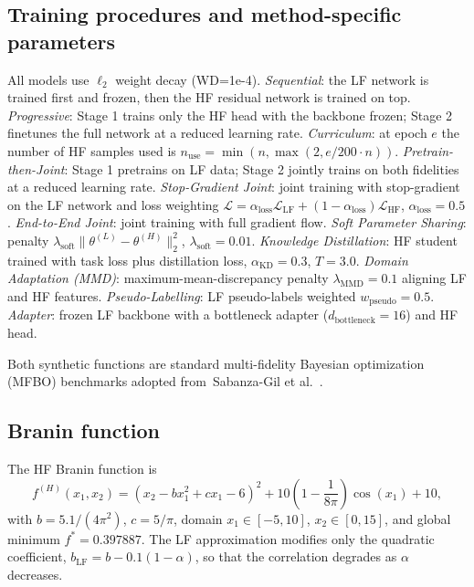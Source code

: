 \documentclass[11pt,a4paper]{article}%
\begin{document}
\subsection{Training procedures and method-specific parameters}
\label{suppsec:training_procedures}
All models use $\ell_2$ weight decay (WD=1e-4). \emph{Sequential}: the LF network is
trained first and frozen, then the HF residual network is trained on top.
\emph{Progressive}: Stage 1 trains only the HF head with the backbone frozen; Stage 2
finetunes the full network at a reduced learning rate. \emph{Curriculum}: at epoch $e$ the
number of HF samples used is $n_{\text{use}} = \min(n, \max(2, e/200 \cdot n))$.
\emph{Pretrain-then-Joint}: Stage 1 pretrains on LF data; Stage 2 jointly trains on both
fidelities at a reduced learning rate. \emph{Stop-Gradient Joint}: joint training with
stop-gradient on the LF network and loss weighting $\mathcal{L} = \alpha_{\text{loss}}
\mathcal{L}_{\text{LF}} + (1-\alpha_{\text{loss}})\mathcal{L}_{\text{HF}}$,
$\alpha_{\text{loss}}=0.5$. \emph{End-to-End Joint}: joint training with full gradient
flow. \emph{Soft Parameter Sharing}: penalty
$\lambda_{\text{soft}}\|\theta^{(L)}-\theta^{(H)}\|_2^2$, $\lambda_{\text{soft}}=0.01$.
\emph{Knowledge Distillation}: HF student trained with task loss plus distillation loss,
$\alpha_{\text{KD}}=0.3$, $T=3.0$. \emph{Domain Adaptation (MMD)}: maximum-mean-discrepancy penalty
$\lambda_{\text{MMD}}=0.1$ aligning LF and HF features. \emph{Pseudo-Labelling}: LF
pseudo-labels weighted $w_{\text{pseudo}}=0.5$. \emph{Adapter}: frozen LF backbone with a
bottleneck adapter ($d_{\text{bottleneck}}=16$) and HF head.


Both synthetic functions are standard multi-fidelity Bayesian optimization (MFBO) benchmarks adopted from~Sabanza-Gil et
al.~\citep{sabanza2025best}.

\subsection{Branin function}
The HF Branin function is
\begin{equation}
f^{(H)}(x_1, x_2) = \left(x_2 - b x_1^2 + c x_1 - 6\right)^2 + 10\left(1 - \frac{1}{8\pi}\right)\cos(x_1) + 10,
\end{equation}
with $b = 5.1/(4\pi^2)$, $c = 5/\pi$, domain $x_1 \in [-5, 10]$, $x_2 \in [0, 15]$, and
global minimum $f^* = 0.397887$. The LF approximation modifies only the
quadratic coefficient, $b_{\text{LF}} = b - 0.1(1-\alpha)$, so that the correlation
degrades as $\alpha$ decreases.
\end{document}
